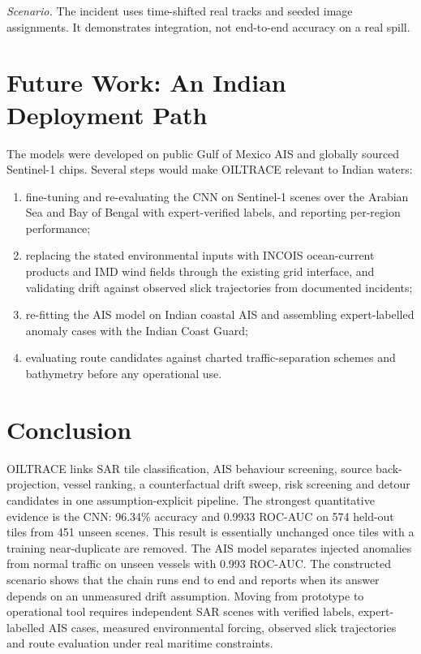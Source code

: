 \documentclass[conference]{IEEEtran}
\begin{document}
\emph{Scenario.} The incident uses time-shifted real tracks and seeded image assignments.
It demonstrates integration, not end-to-end accuracy on a real spill.

\section{Future Work: An Indian Deployment Path}

The models were developed on public Gulf of Mexico AIS and globally sourced Sentinel-1
chips. Several steps would make OILTRACE relevant to Indian waters:
\begin{enumerate}
  \item fine-tuning and re-evaluating the CNN on Sentinel-1 scenes over the Arabian Sea and
  Bay of Bengal with expert-verified labels, and reporting per-region performance;
  \item replacing the stated environmental inputs with INCOIS ocean-current products and IMD
  wind fields through the existing grid interface, and validating drift against observed
  slick trajectories from documented incidents;
  \item re-fitting the AIS model on Indian coastal AIS and assembling expert-labelled
  anomaly cases with the Indian Coast Guard;
  \item evaluating route candidates against charted traffic-separation schemes and
  bathymetry before any operational use.
\end{enumerate}

\section{Conclusion}

OILTRACE links SAR tile classification, AIS behaviour screening, source back-projection,
vessel ranking, a counterfactual drift sweep, risk screening and detour candidates in one
assumption-explicit pipeline. The strongest quantitative evidence is the CNN: 96.34\%
accuracy and 0.9933 ROC-AUC on 574 held-out tiles from 451 unseen scenes. This result is
essentially unchanged once tiles with a training near-duplicate are removed. The AIS
model separates injected anomalies from normal traffic on unseen vessels with 0.993
ROC-AUC. The constructed scenario shows that the chain runs end to end and reports when
its answer depends on an unmeasured drift assumption. Moving from prototype to operational
tool requires independent SAR scenes with verified labels, expert-labelled AIS cases,
measured environmental forcing, observed slick trajectories and route evaluation under
real maritime constraints.
\end{document}
